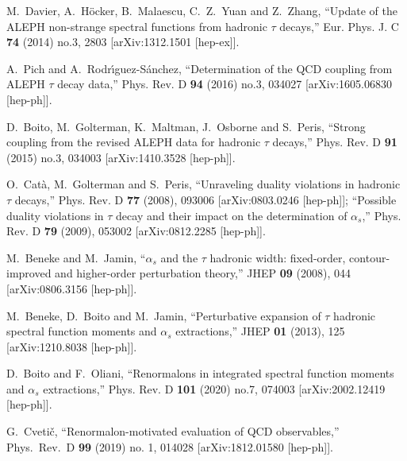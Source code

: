 \documentclass[aps,nofootinbib,showkeys,noshowpacs,preprintnumbers,amsmath,amssymb]{revtex4}
\begin{document}
\begin{thebibliography}{99}
M.~Davier, A.~H\"ocker, B.~Malaescu, C.~Z.~Yuan and Z.~Zhang,
``Update of the ALEPH non-strange spectral functions from hadronic $\tau$ decays,''
Eur. Phys. J. C \textbf{74} (2014) no.3, 2803
[arXiv:1312.1501 [hep-ex]].

A.~Pich and A.~Rodr\'\i{}guez-S\'anchez,
``Determination of the QCD coupling from ALEPH $\tau$ decay data,''
Phys. Rev. D \textbf{94} (2016) no.3, 034027
[arXiv:1605.06830 [hep-ph]].

D.~Boito, M.~Golterman, K.~Maltman, J.~Osborne and S.~Peris,
``Strong coupling from the revised ALEPH data for hadronic $\tau$ decays,''
Phys. Rev. D \textbf{91} (2015) no.3, 034003
[arXiv:1410.3528 [hep-ph]].

O.~Cat\`a, M.~Golterman and S.~Peris,
``Unraveling duality violations in hadronic $\tau$ decays,''
Phys. Rev. D \textbf{77} (2008), 093006
[arXiv:0803.0246 [hep-ph]];
``Possible duality violations in $\tau$ decay and their impact on the determination of $\alpha_s$,''
Phys. Rev. D \textbf{79} (2009), 053002
[arXiv:0812.2285 [hep-ph]].

M.~Beneke and M.~Jamin,
``$\alpha_s$ and the $\tau$ hadronic width: fixed-order, contour-improved and higher-order perturbation theory,''
JHEP \textbf{09} (2008), 044
[arXiv:0806.3156 [hep-ph]].

M.~Beneke, D.~Boito and M.~Jamin,
``Perturbative expansion of $\tau$ hadronic spectral function moments and $\alpha_s$ extractions,''
JHEP \textbf{01} (2013), 125
[arXiv:1210.8038 [hep-ph]].

D.~Boito and F.~Oliani,
``Renormalons in integrated spectral function moments and $\alpha_s$ extractions,''
Phys. Rev. D \textbf{101} (2020) no.7, 074003
[arXiv:2002.12419 [hep-ph]].

  G.~Cveti\v{c},
  ``Renormalon-motivated evaluation of QCD observables,''
  Phys.\ Rev.\ D {\bf 99} (2019) no. 1, 014028
  [arXiv:1812.01580 [hep-ph]].


\end{thebibliography}
\end{document}
